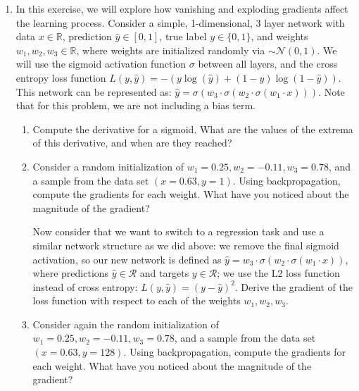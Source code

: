 \documentclass[a4paper]{article}
\begin{document}
\begin{enumerate}
		\item In this exercise, we will explore how vanishing and exploding gradients affect the learning process. Consider a simple, 1-dimensional, 3 layer network with data $x \in \mathbb{R}$, prediction $\hat{y} \in [0, 1]$, true label $y \in \{0, 1\}$, and weights $w_1, w_2, w_3 \in \mathbb{R}$, where weights are initialized randomly via $\sim \mathcal{N}(0, 1)$. We will use the sigmoid activation function $\sigma$ between all layers, and the cross entropy loss function $L(y, \hat{y}) = -(y \log(\hat{y}) + (1-y) \log(1-\hat{y}))$. This network can be represented as: $\hat{y} = \sigma(w_3 \cdot \sigma(w_2 \cdot \sigma(w_1 \cdot x)))$. Note that for this problem, we are not including a bias term.
		\begin{enumerate}
			\item Compute the derivative for a sigmoid. What are the values of the extrema of this derivative, and when are they reached?
			\item Consider a random initialization of $w_1 = 0.25, w_2 = -0.11, w_3 = 0.78$, and a sample from the data set $(x = 0.63, y = 1)$. Using backpropagation, compute the gradients for each weight. What have you noticed about the magnitude of the gradient?
		
		    Now consider that we want to switch to a regression task and use a similar network structure as we did above: we  remove the final sigmoid activation, so our new network is defined as $\hat{y} = w_3 \cdot \sigma(w_2 \cdot \sigma(w_1 \cdot x))$, where predictions $\hat{y} \in \mathcal{R}$ and targets $y \in \mathcal{R}$; we use the L2 loss function instead of cross entropy: $L(y, \hat{y}) = (y - \hat{y})^2$. Derive the gradient of the loss function with respect to each of the weights $w_1, w_2, w_3$.
		
			\item Consider again the random initialization of $w_1 = 0.25, w_2 = -0.11, w_3 = 0.78$, and a sample from the data set $(x = 0.63, y = 128)$. Using backpropagation, compute the gradients for each weight. What have you noticed about the magnitude of the gradient?
		\end{enumerate}
		
		
		
	\end{enumerate}
	
	
\end{document}
